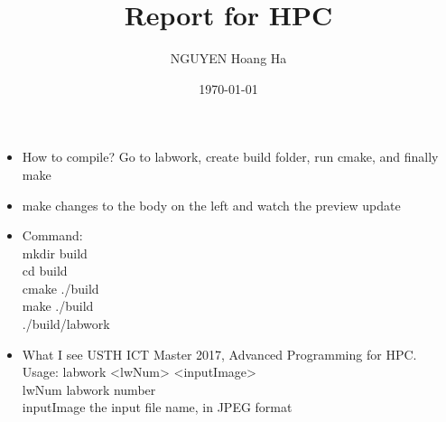 \documentclass[12pt]{article}
\title{Report for HPC}
\author{NGUYEN Hoang Ha}
\date{\today}
\begin{document}
\maketitle


\begin{itemize}
  \item How to compile? Go to labwork, create build folder, run cmake, and finally make
  \item make changes to the body on the left and watch the preview update
  \item Command:\\ 
          mkdir build\\
          cd build\\
          cmake ./build\\
          make ./build\\
          ./build/labwork\\
  
  \item What I see
        USTH ICT Master 2017, Advanced Programming for HPC.\\
Usage: labwork <lwNum> <inputImage>\\
   lwNum        labwork number\\
   inputImage   the input file name, in JPEG format\\
\end{itemize}
\end{document}
